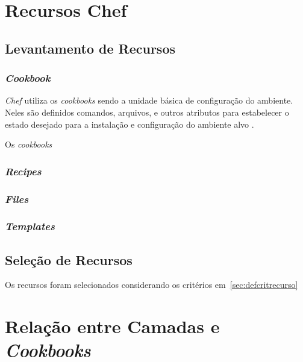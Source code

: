 \section{Recursos Chef}

\subsection{Levantamento de Recursos}
\label{sec:lev-rec}
\subsubsection{\textit{Cookbook}}

\textit{Chef} utiliza os \textit{cookbooks} sendo a unidade básica de configuração do
ambiente. Neles são definidos comandos, arquivos, e outros atributos
para estabelecer o estado desejado para a instalação e configuração
do ambiente alvo \cite{sharma:2015}.

Os \textit{cookbooks} 


\subsubsection{\textit{Recipes}}
\subsubsection{\textit{Files}}
\subsubsection{\textit{Templates}}


\subsection{Seleção de Recursos}
Os recursos foram selecionados considerando os critérios em~\ref{sec:defcritrecurso}



\section{Relação entre Camadas e \textit{Cookbooks}}


